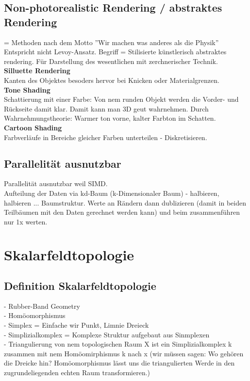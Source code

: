 \documentclass{article}
\begin{document}
\subsection{Non-photorealistic Rendering / abstraktes Rendering }
= Methoden nach dem Motto ''Wir machen was anderes als die Physik'' \\
Entspricht nicht Levoy-Ansatz. Begriff = Stilisierte künstlerisch abstraktes rendering. Für Darstellung des wesentlichen mit zerchnerischer Technik.\\

\noindent \textbf{Silluette Rendering}\\
Kanten des Objektes besoders hervor bei Knicken oder Materialgrenzen.\\

\noindent \textbf{Tone Shading}\\
Schattierung mit einer Farbe: Von nem runden Objekt werden die Vorder- und Rückseite damit klar. Damit kann man 3D geut wahrnehmen. Durch Wahrnehmungstheorie: Warmer ton vorne, kalter Farbton im Schatten.\\

\noindent \textbf{Cartoon Shading}\\
Farbverläufe in Bereiche gleicher Farben unterteilen - Diskretisieren.\\


\subsection{Parallelität ausnutzbar}
Parallelität ausnutzbar weil SIMD.\\
Aufteilung der Daten via kd-Baum (k-Dimensionaler Baum) - halbieren, halbieren ... Baumstruktur. Werte an Rändern dann dublizieren (damit in beiden Teilbäumen mit den Daten gerechnet werden kann) und beim zusammenführen nur 1x werten.


\pagebreak
\section{Skalarfeldtopologie}

\subsection{Definition Skalarfeldtopologie}
- Rubber-Band Geometry\\
- Homöomorphismus \\


- Simplex = Einfache wir Punkt, Limnie Dreieck\\
- Simplizialkomplex = Komplexe Struktur aufgebaut aus Sinmplexen\\
- Triangulierung von nem topologischen Raum X ist ein Simplizialkomplex k zusammen mit nem Homöomirphismus k nach x (wir müssen sagen: Wo gehören die Dreicke hin? Homöomorphismus lässt uns die triangulierten Werde in den zugrundeliegenden echten Raum transformieren.)
\end{document}
